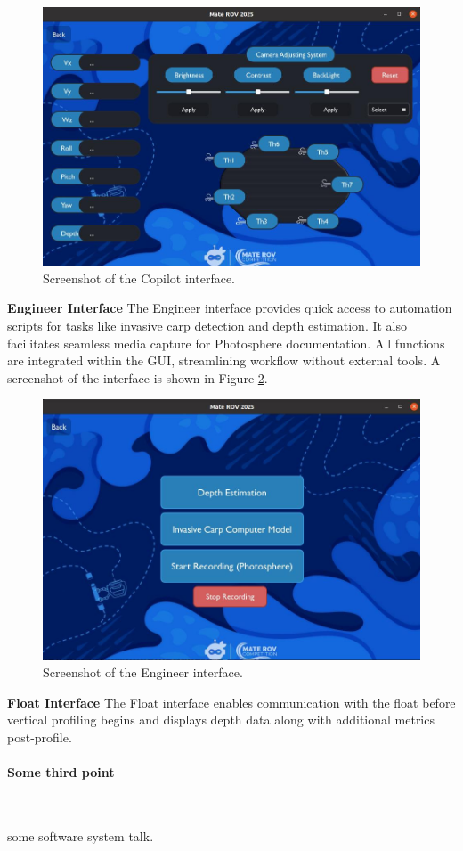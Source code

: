 \begin{figure}[ht]
    \centering
    \includegraphics[width=0.8\columnwidth]{Sections/2Design Rationale/images/Copilot_interface.jpeg}
    \caption{Screenshot of the Copilot interface.}
    \label{fig:copilot_interface}
\end{figure}

\vspace{0.2cm}
\textbf{Engineer Interface}
The Engineer interface provides quick access to automation scripts for tasks like invasive carp detection and depth estimation. It also facilitates seamless media capture for Photosphere documentation. All functions are integrated within the GUI, streamlining workflow without external tools. A screenshot of the interface is shown in Figure \ref{fig:Engineer_interface}.

\begin{figure}[h]
    \centering
    \includegraphics[width=0.8\columnwidth]{Sections/2Design Rationale/images/Engineer_interface.jpeg}
    \caption{Screenshot of the Engineer interface.}
    \label{fig:Engineer_interface}
\end{figure}

\vspace{0.2cm}
\textbf{Float Interface}
The Float interface enables communication with the float before vertical profiling begins and displays depth data along with additional metrics post-profile.


\paragraph{Some third point} \ \\
\vspace{-0.5cm}

some software system talk.